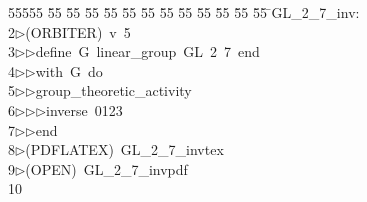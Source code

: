 %
%
\begin{tabbing}
55555 \= 55 \= 55 \= 55 \= 55 \= 55 \= 55 \= 55 \= 55 \= 55 \= 55 \= 55 \= 55 \= \>GL\_2\_7\_inv:\\[0pt]
2\>$\triangleright$\>(ORBITER)\ v\ 5\ \\[0pt]
3\>$\triangleright$\>$\triangleright$\>define\ G\ linear\_group\ GL\ 2\ 7\ end\ \\[0pt]
4\>$\triangleright$\>$\triangleright$\>with\ G\ do\ \\[0pt]
5\>$\triangleright$\>$\triangleright$\>group\_theoretic\_activity\ \\[0pt]
6\>$\triangleright$\>$\triangleright$\>$\triangleright$\>inverse\ 0123\ \\[0pt]
7\>$\triangleright$\>$\triangleright$\>end\\[0pt]
8\>$\triangleright$\>(PDFLATEX)\ GL\_2\_7\_invtex\\[0pt]
9\>$\triangleright$\>(OPEN)\ GL\_2\_7\_invpdf\\[0pt]
10\>\end{tabbing}
